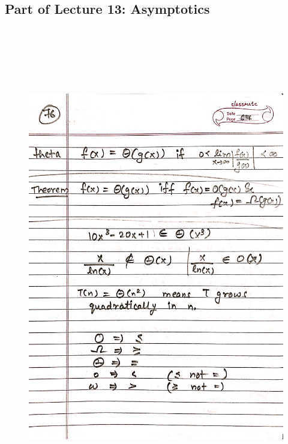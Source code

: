 \newpage
{\color{black} \subsection*{Part of Lecture 13: Asymptotics}}
\begin{figure}[H]
    \centering
    \includegraphics[width=16cm, height=21cm]{"./MIT-6.042J/MIT-6042J-076"}
\end{figure}

